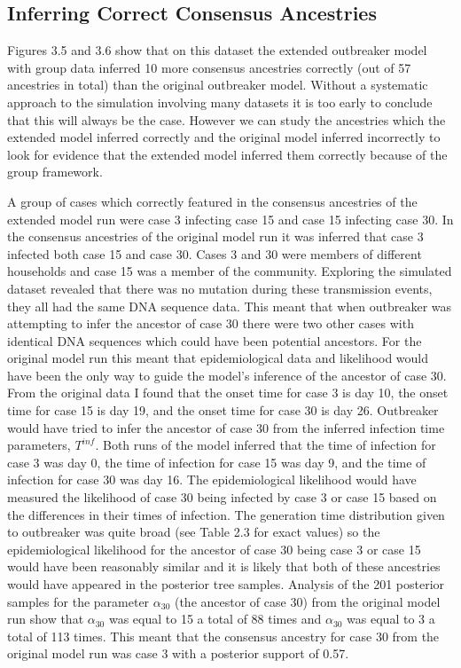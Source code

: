 \documentclass[11pt,a4paper]{report}
\begin{document}
\subsection{Inferring Correct Consensus Ancestries}
Figures 3.5 and 3.6 show that on this dataset the extended outbreaker model with group data inferred 10 more consensus ancestries correctly (out of 57 ancestries in total) than the original outbreaker model. Without a systematic approach to the simulation involving many datasets it is too early to conclude that this will always be the case. However we can study the ancestries which the extended model inferred correctly and the original model inferred incorrectly to look for evidence that the extended model inferred them correctly because of the group framework.  

A group of cases which correctly featured in the consensus ancestries of the extended model run were case 3 infecting case 15 and case 15 infecting case 30. In the consensus ancestries of the original model run it was inferred that case 3 infected both case 15 and case 30. Cases 3 and 30 were members of different households and case 15 was a member of the community. Exploring the simulated dataset revealed that there was no mutation during these transmission events, they all had the same DNA sequence data. This meant that when outbreaker was attempting to infer the ancestor of case 30 there were two other cases with identical DNA sequences which could have been potential ancestors. For the original model run this meant that epidemiological data and likelihood would have been the only way to guide the model's inference of the ancestor of case 30. From the original data I found that the onset time for case 3 is day 10, the onset time for case 15 is day 19, and the onset time for case 30 is day 26. Outbreaker would have tried to infer the ancestor of case 30 from the inferred infection time parameters, $T^{inf}$. Both runs of the model inferred that the time of infection for case 3 was day 0, the time of infection for case 15 was day 9, and the time of infection for case 30 was day 16. The epidemiological likelihood would have measured the likelihood of case 30 being infected by case 3 or case 15 based on the differences in their times of infection. The generation time distribution given to outbreaker was quite broad (see Table 2.3 for exact values) so the epidemiological likelihood for the ancestor of case 30 being case 3 or case 15 would have been reasonably similar and it is likely that both of these ancestries would have appeared in the posterior tree samples. Analysis of the 201 posterior samples for the parameter $\alpha_{30}$ (the ancestor of case 30) from the original model run show that $\alpha_{30}$ was equal to 15 a total of 88 times and $\alpha_{30}$ was equal to 3 a total of 113 times. This meant that the consensus ancestry for case 30 from the original model run was case 3 with a posterior support of 0.57.
\end{document}
